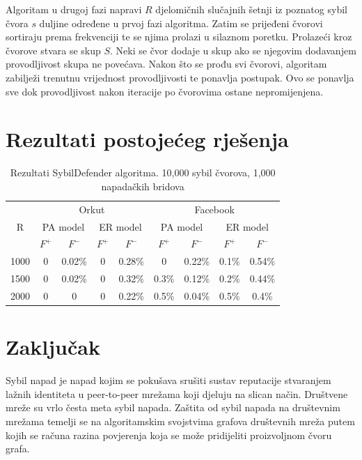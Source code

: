 \documentclass[times, utf8, seminar, numeric]{fer}
\begin{document}
Algoritam u drugoj fazi napravi $R$ djelomičnih slučajnih šetnji iz poznatog sybil čvora $s$ duljine određene u prvoj fazi algoritma. Zatim se prijeđeni čvorovi sortiraju prema frekvenciji te se njima prolazi u silaznom poretku. Prolazeći kroz čvorove stvara se skup $S$. Neki se čvor dodaje u skup ako se njegovim dodavanjem provodljivost skupa ne povećava. Nakon što se prođu svi čvorovi, algoritam zabilježi trenutnu vrijednost provodljivosti te ponavlja postupak. Ovo se ponavlja sve dok provodljivost nakon iteracije po čvorovima ostane nepromijenjena.

\chapter{Rezultati postojećeg rješenja}
\begin{table}[!h]
	\centering
	\caption{Rezultati SybilDefender algoritma. 10,000 sybil čvorova, 1,000 napadačkih bridova}
	\label{tbl:results}
	
	\begin{tabular}{|c|c|c|c|c|c|c|c|c|} \hline
    \multirow{3}{*}{R} & \multicolumn{4}{c|}{Orkut} & \multicolumn{4}{c|}{Facebook} \\
    & \multicolumn{2}{c}{PA model} & \multicolumn{2}{c|}{ER model} & \multicolumn{2}{c}{PA model} & \multicolumn{2}{c|}{ER model} \\
    & \multicolumn{1}{c}{$F^+$} & \multicolumn{1}{c}{$F^-$} & \multicolumn{1}{c}{$F^+$} & \multicolumn{1}{c|}{$F^-$} & \multicolumn{1}{c}{$F^+$} & \multicolumn{1}{c}{$F^-$} & \multicolumn{1}{c}{$F^+$} & \multicolumn{1}{c|}{$F^-$} \\ \hline
    1000 & 0 & 0.02\% & 0 & 0.28\% & 0 & 0.22\% & 0.1\% & 0.54\% \\
    1500 & 0 & 0.02\% & 0 & 0.32\% & 0.3\% & 0.12\% & 0.2\% & 0.44\% \\
    2000 & 0 & 0 & 0 & 0.22\% & 0.5\% & 0.04\% & 0.5\% & 0.4\% \\
		\hline
	\end{tabular}
\end{table}

\chapter{Zaključak}




\begin{sazetak}
  Sybil napad je napad kojim se pokušava srušiti sustav reputacije stvaranjem lažnih identiteta u peer-to-peer mrežama koji djeluju na slican način. Društvene mreže su vrlo česta meta sybil napada. Zaštita od sybil napada na društevnim mrežama temelji se na algoritamskim svojstvima grafova društevnih mreža putem kojih se računa razina povjerenja koja se može pridijeliti proizvoljnom čvoru grafa.

\end{sazetak}
\end{document}
